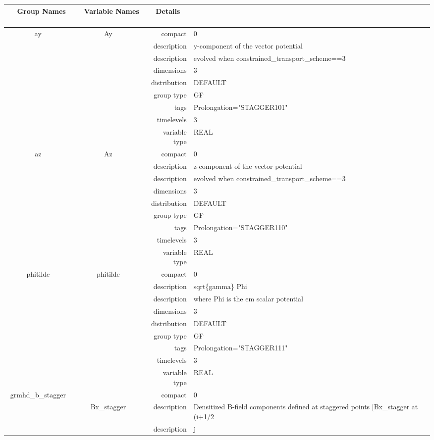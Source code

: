 \documentclass{article}
\begin{document}
\begin{tabular*}{150mm}{|c|c@{\extracolsep{\fill}}|rl|} \hline 
~ {\bf Group Names} ~ & ~ {\bf Variable Names} ~  &{\bf Details} ~ & ~ \\ 
\hline 
ay & Ay & compact & 0 \\ 
 &  & description & y-component of the vector potential \\ 
& ~ & description &  evolved when constrained\_transport\_scheme==3 \\ 
 &  & dimensions & 3 \\ 
 &  & distribution & DEFAULT \\ 
 &  & group type & GF \\ 
 &  & tags & Prolongation="STAGGER101" \\ 
 &  & timelevels & 3 \\ 
 &  & variable type & REAL \\ 
\hline 
az & Az & compact & 0 \\ 
 &  & description & z-component of the vector potential \\ 
& ~ & description &  evolved when constrained\_transport\_scheme==3 \\ 
 &  & dimensions & 3 \\ 
 &  & distribution & DEFAULT \\ 
 &  & group type & GF \\ 
 &  & tags & Prolongation="STAGGER110" \\ 
 &  & timelevels & 3 \\ 
 &  & variable type & REAL \\ 
\hline 
phitilde & phitilde & compact & 0 \\ 
 &  & description & sqrt\{gamma\} Phi \\ 
& ~ & description &  where Phi is the em scalar potential \\ 
 &  & dimensions & 3 \\ 
 &  & distribution & DEFAULT \\ 
 &  & group type & GF \\ 
 &  & tags & Prolongation="STAGGER111" \\ 
 &  & timelevels & 3 \\ 
 &  & variable type & REAL \\ 
\hline 
grmhd\_b\_stagger &  & compact & 0 \\ 
 & Bx\_stagger & description & Densitized B-field components defined at staggered points [Bx\_stagger at (i+1/2 \\ 
& ~ & description & j \\ 

\end{tabular*}
\end{document}
